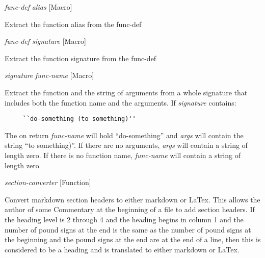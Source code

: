 \vspace{1em}
\noindent
{}
\usebox{\funcname}\emph{func-def} \emph{alias}
 \hfill [Macro]

\begin{doc-string}
Extract the function alias from the func-def
\end{doc-string}

\vspace{1em}
\noindent
{}
\usebox{\funcname}\emph{func-def} \emph{signature}
 \hfill [Macro]

\begin{doc-string}
Extract the function signature from the func-def
\end{doc-string}

\vspace{1em}
\noindent
{}
\usebox{\funcname}\emph{signature} \emph{func-name}
 \hfill [Macro]
\hspace*{\wd\funcname}

\begin{doc-string}
Extract the function and the string of arguments from a whole signature that
includes both the function name and the arguments.  If \emph{signature} contains:

\small{\begin{verbatim}
     ``do-something (to something)''
\end{verbatim}}

The on return \emph{func-name} will hold ``do-something'' and \emph{args} will contain the
string ``to something)''.  If there are no arguments, \emph{args} will contain a string
of length zero.  If there is no function name, \emph{func-name} will contain a string
of length zero
\end{doc-string}

\vspace{1em}
\noindent
{}
\usebox{\funcname}\emph{section-converter}
 \hfill [Function]

\begin{doc-string}
Convert markdown section headers to either markdown or LaTex.
This allows the author of some Commentary at the beginning of a file to add section
headers.  If the heading level is 2 through 4 and the heading begins in column 1 and
the number of pound signs at the end is the same as the number of pound signs at
the beginning and the pound signs at the end are at the end of a line, then this is
considered to be a heading and is translated to either markdown or LaTex.
\end{doc-string}

